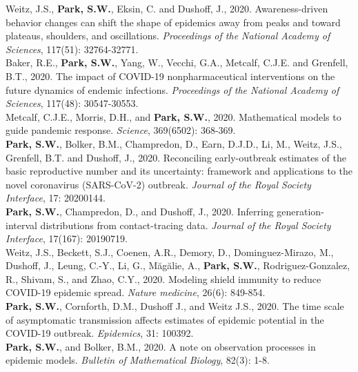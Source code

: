 \documentclass[11pt]{article} %
\begin{document}
 Weitz, J.S., \textbf{Park, S.W.}, Eksin, C. and Dushoff, J., 2020. Awareness-driven behavior changes can shift the shape of epidemics away from peaks and toward plateaus, shoulders, and oscillations. \textit{Proceedings of the National Academy of Sciences}, 117(51): 32764-32771.\\

 Baker, R.E., \textbf{Park, S.W.}, Yang, W., Vecchi, G.A., Metcalf, C.J.E. and Grenfell, B.T., 2020. The impact of COVID-19 nonpharmaceutical interventions on the future dynamics of endemic infections. \textit{Proceedings of the National Academy of Sciences}, 117(48): 30547-30553.\\

 Metcalf, C.J.E., Morris, D.H., and \textbf{Park, S.W.}, 2020. Mathematical models to guide pandemic response. \textit{Science}, 369(6502): 368-369.\\

 \textbf{Park, S.W.}, Bolker, B.M., Champredon, D., Earn, D.J.D., Li, M., Weitz, J.S., Grenfell, B.T. and Dushoff, J., 2020. Reconciling early-outbreak estimates of the basic reproductive number and its uncertainty: framework and applications to the novel coronavirus (SARS-CoV-2) outbreak. \textit{Journal of the Royal Society Interface}, 17: 20200144.\\

 \textbf{Park, S.W.}, Champredon, D., and Dushoff, J., 2020. Inferring generation-interval distributions from contact-tracing data. \textit{Journal of the Royal Society Interface}, 17(167): 20190719.\\

 Weitz, J.S., Beckett, S.J., Coenen, A.R., Demory, D., Dominguez-Mirazo, M., Dushoff, J., Leung, C.-Y., Li, G., Măgălie, A., \textbf{Park, S.W.}, Rodriguez-Gonzalez, R., Shivam, S., and Zhao, C.Y., 2020. Modeling shield immunity to reduce COVID-19 epidemic spread. \textit{Nature medicine}, 26(6): 849-854.\\

 \textbf{Park, S.W.}, Cornforth, D.M., Dushoff J., and Weitz J.S., 2020. The time scale of asymptomatic transmission affects estimates of epidemic potential in the COVID-19 outbreak. \textit{Epidemics}, 31: 100392.\\

 \textbf{Park, S.W.}, and Bolker, B.M., 2020. A note on observation processes in epidemic models. \textit{Bulletin of Mathematical Biology}, 82(3): 1-8.\\
\end{document}
